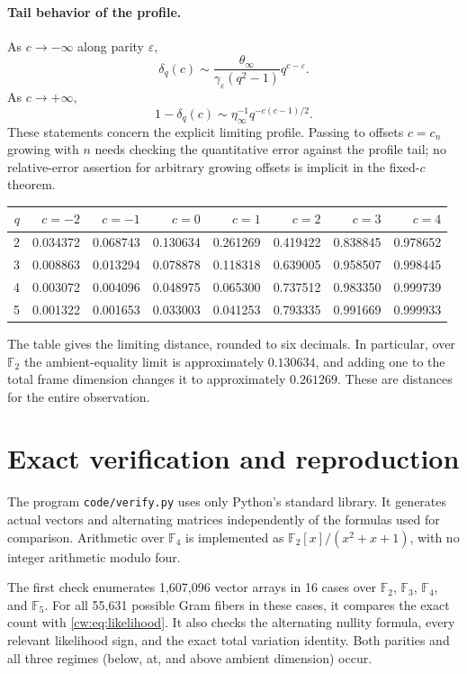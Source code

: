 \documentclass[11pt,letterpaper]{article}
\begin{document}
\paragraph{Tail behavior of the profile.}
As $c\to-\infty$ along parity $\varepsilon$,
\[
 \delta_q(c)\sim
 \frac{\theta_\infty}{\gamma_\varepsilon(q^2-1)}q^{c-\varepsilon}.
\]
As $c\to+\infty$,
\[
 1-\delta_q(c)\sim\eta_\infty^{-1}q^{-c(c-1)/2}.
\]
These statements concern the explicit limiting profile. Passing to offsets
$c=c_n$ growing with $n$ needs checking the quantitative error against the
profile tail; no relative-error assertion for arbitrary growing offsets
is implicit in the fixed-$c$ theorem.



\begin{center}
\small
\begin{tabular}{r rrrrrrr}
\toprule
$q$ & $c=-2$ & $c=-1$ & $c=0$ & $c=1$ & $c=2$ & $c=3$ & $c=4$\\
\midrule
2 & 0.034372 & 0.068743 & 0.130634 & 0.261269 & 0.419422 & 0.838845 & 0.978652 \\
3 & 0.008863 & 0.013294 & 0.078878 & 0.118318 & 0.639005 & 0.958507 & 0.998445 \\
4 & 0.003072 & 0.004096 & 0.048975 & 0.065300 & 0.737512 & 0.983350 & 0.999739 \\
5 & 0.001322 & 0.001653 & 0.033003 & 0.041253 & 0.793335 & 0.991669 & 0.999933 \\
\bottomrule
\end{tabular}
\end{center}
The table gives the limiting distance, rounded to six decimals. In
particular, over $\mathbb F_2$ the ambient-equality limit is approximately
$0.130634$, and adding one to the total frame dimension changes it to
approximately $0.261269$. These are distances for the entire observation.

\section{Exact verification and reproduction}
The program \texttt{code/verify.py} uses only Python's standard library.
It generates actual vectors and alternating matrices independently of the
formulas used for comparison. Arithmetic over $\mathbb F_4$ is implemented
as $\mathbb F_2[x]/(x^2+x+1)$, with no integer arithmetic modulo four.

The first check enumerates 1,607,096 vector arrays in 16 cases over
$\mathbb F_2$, $\mathbb F_3$, $\mathbb F_4$, and $\mathbb F_5$. For all
55,631 possible Gram fibers in these cases, it compares the exact count
with \eqref{cw:eq:likelihood}. It also checks the alternating nullity
formula, every relevant likelihood sign, and the exact total variation
identity. Both parities and all three regimes (below, at, and above
ambient dimension) occur.
\end{document}
